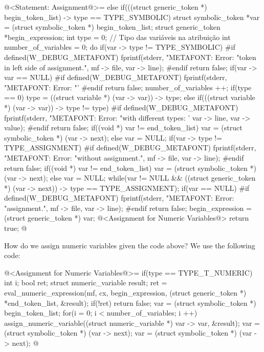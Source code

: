 \iniciocodigo
@<Statement: Assignment@>=
else if(((struct generic_token *) begin_token_list) -> type ==
        TYPE_SYMBOLIC){
  struct symbolic_token *var = (struct symbolic_token *) begin_token_list;
  struct generic_token *begin_expression;
  int type = 0; // Tipo das variáveis na atribuição
  int number_of_variables = 0;
  do{
    if(var -> type != TYPE_SYMBOLIC){
#if defined(W_DEBUG_METAFONT)
      fprintf(stderr, "METAFONT: Error: %
              "token in left side of assignment.\n", mf -> file,
              var -> line);
#endif
      return false;
    }
    if(var -> var == NULL){
#if defined(W_DEBUG_METAFONT)
      fprintf(stderr, "METAFONT: Error: %
              "'%
#endif
      return false;
    }
    number_of_variables ++;
    if(type == 0)
      type = ((struct variable *) (var -> var)) -> type;
    else if(((struct variable *) (var -> var)) -> type != type){
#if defined(W_DEBUG_METAFONT)
      fprintf(stderr, "METAFONT: Error: %
              "with different types: '%
              var -> line, var -> value);
#endif
      return false;    
    }
    if((void *) var != end_token_list)
      var = (struct symbolic_token *) (var -> next);
    else
      var = NULL;
    if(var -> type != TYPE_ASSIGNMENT){
#if defined(W_DEBUG_METAFONT)
      fprintf(stderr, "METAFONT: Error: %
              "without assignment.\n", mf -> file, var -> line);
#endif
      return false;    
    }
    if((void *) var != end_token_list)
      var = (struct symbolic_token *) (var -> next);
    else
      var = NULL;
  } while(var != NULL &&
          ((struct generic_token *) (var -> next)) -> type ==
          TYPE_ASSIGNMENT);
  if(var == NULL){
#if defined(W_DEBUG_METAFONT)
      fprintf(stderr, "METAFONT: Error: %
              "assignment.\n", mf -> file, var -> line);
#endif
      return false;
  }
  begin_expression = (struct generic_token *) var;
  @<Assignment for Numeric Variables@>
  return true;
}
@
\fimcodigo


How do we assign numeric variables given the code above? We use the
following code:

\iniciocodigo
@<Assignment for Numeric Variables@>=
if(type == TYPE_T_NUMERIC){
  int i;
  bool ret;
  struct numeric_variable result;
  ret = eval_numeric_expression(mf, cx, begin_expression,
                               (struct generic_token *) *end_token_list,
                               &result);
  if(!ret)
    return false;
  var = (struct symbolic_token *) begin_token_list;
  for(i = 0; i < number_of_variables; i ++){
    assign_numeric_variable((struct numeric_variable *) var -> var,
                            &result);
    var = (struct symbolic_token *) (var -> next);
    var = (struct symbolic_token *) (var -> next);
  }
}
@
\fimcodigo

